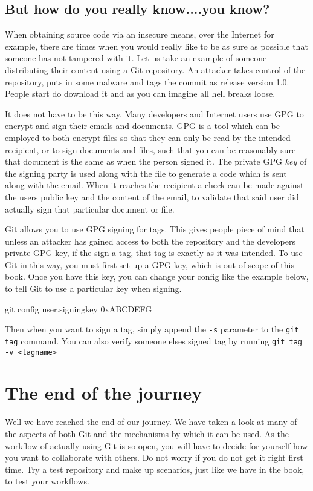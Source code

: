 \subsection{But how do you really know....you know?}
When obtaining source code via an insecure means, over the Internet for example,
there are times when you would really like to be as sure as possible that someone has not tampered with it.
Let us take an example of someone distributing their content using a Git repository.
An attacker takes control of the repository, puts in some malware and tags the commit as release version 1.0.
People start do download it and as you can imagine all hell breaks loose.

It does not have to be this way.
Many developers and Internet users use GPG to encrypt and sign their emails and documents.
GPG is a tool which can be employed to both encrypt files so that they can only be read by the intended recipient, or to sign documents and files, such that you can be reasonably sure that document is the same as when the person signed it.
The private GPG \emph{key} of the signing party is used along with the file to generate a code which is sent along with the email.
When it reaches the recipient a check can be made against the users public key and the content of the email, to validate that said user did actually sign that particular document or file.

Git allows you to use GPG signing for tags.
This gives people piece of mind that unless an attacker has gained access to both the repository and the developers private GPG key, if the sign a tag, that tag is exactly as it was intended.
To use Git in this way, you must first set up a GPG key, which is out of scope of this book.
Once you have this key, you can change your config like the example below, to tell Git to use a particular key when signing.

\begin{code}
git config user.signingkey 0xABCDEFG
\end{code}

Then when you want to sign a tag, simply append the \texttt{-s} parameter to the \texttt{git tag} command.
You can also verify someone elses signed tag by running \texttt{git tag -v <tagname>}

\section{The end of the journey}
Well we have reached the end of our journey.
We have taken a look at many of the aspects of both Git and the mechanisms by which it can be used.
As the workflow of actually using Git is so open, you will have to decide for yourself how you want to collaborate with others.
Do not worry if you do not get it right first time.
Try a test repository and make up scenarios, just like we have in the book, to test your workflows.

